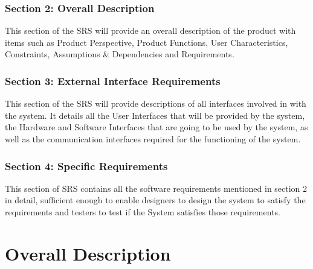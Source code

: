 \documentclass[12pt, a4]{report}
\begin{document}
\subsection{Section 2: Overall Description} This section of the SRS will provide an overall description of the product with items such as Product Perspective, Product Functions, User Characteristics, Constraints, Assumptions \& Dependencies and Requirements.
\subsection{Section 3: External Interface Requirements} This section of the SRS will provide descriptions of all interfaces involved in with the system. It details all the User Interfaces that will be provided by the system, the Hardware and Software Interfaces that are going to be used by the system, as well as the communication interfaces required for the functioning of the system.
\subsection{Section 4: Specific Requirements} This section of SRS contains all the software requirements mentioned in section 2 in detail, sufficient enough to enable designers to design the system to satisfy the requirements and testers to test if the System satisfies those requirements.


\chapter{Overall Description}
\end{document}
